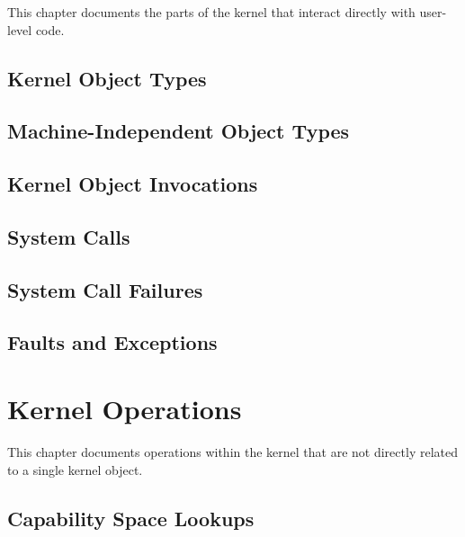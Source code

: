\documentclass[a4paper,11pt,twoside]{report}
\begin{document}
This chapter documents the parts of the kernel that interact directly with user-level code.

\section{Kernel Object Types}\label{sec:api.types}


\section{Machine-Independent Object Types}\label{sec:api.types.universal}


\section{Kernel Object Invocations}\label{sec:api.invocation}


\section{System Calls}\label{sec:api.syscall}


\section{System Call Failures}\label{sec:api.failures}


\section{Faults and Exceptions}\label{sec:api.faults}


\chapter{Kernel Operations}\label{sec:kernel}

This chapter documents operations within the kernel that are not directly related to a single kernel object.

\section{Capability Space Lookups}\label{sec:kernel.cspace}

\end{document}
